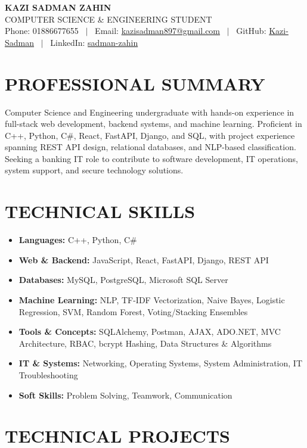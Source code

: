 \documentclass[9.5pt,a4paper]{article}
\newcommand{\resitem}[1]{\item #1}
\begin{document}
\begin{center}
    {\Huge \bfseries KAZI SADMAN ZAHIN} \\[1pt]
    {\large COMPUTER SCIENCE \& ENGINEERING STUDENT} \\[3pt]
    \small
    Phone: 01886677655 ~$|$~
    Email: \href{mailto:kazisadman897@gmail.com}{kazisadman897@gmail.com} ~$|$~
    GitHub: \href{https://github.com/Kazi-Sadman}{Kazi-Sadman} ~$|$~
    LinkedIn: \href{https://linkedin.com/in/sadman-zahin}{sadman-zahin}
\end{center}

\section*{PROFESSIONAL SUMMARY}
Computer Science and Engineering undergraduate with hands-on experience in full-stack web development, backend systems, and machine learning. Proficient in C++, Python, C\#, React, FastAPI, Django, and SQL, with project experience spanning REST API design, relational databases, and NLP-based classification. Seeking a banking IT role to contribute to software development, IT operations, system support, and secure technology solutions.

\section*{TECHNICAL SKILLS}
\begin{itemize}
    \resitem{\textbf{Languages:} C++, Python, C\#}
    \resitem{\textbf{Web \& Backend:} JavaScript, React, FastAPI, Django, REST API}
    \resitem{\textbf{Databases:} MySQL, PostgreSQL, Microsoft SQL Server}
    \resitem{\textbf{Machine Learning:} NLP, TF-IDF Vectorization, Naive Bayes, Logistic Regression, SVM, Random Forest, Voting/Stacking Ensembles}
    \resitem{\textbf{Tools \& Concepts:} SQLAlchemy, Postman, AJAX, ADO.NET, MVC Architecture, RBAC, bcrypt Hashing, Data Structures \& Algorithms}
    \resitem{\textbf{IT \& Systems:} Networking, Operating Systems, System Administration, IT Troubleshooting}
    \resitem{\textbf{Soft Skills:} Problem Solving, Teamwork, Communication}
\end{itemize}

\section*{TECHNICAL PROJECTS}
\end{document}
